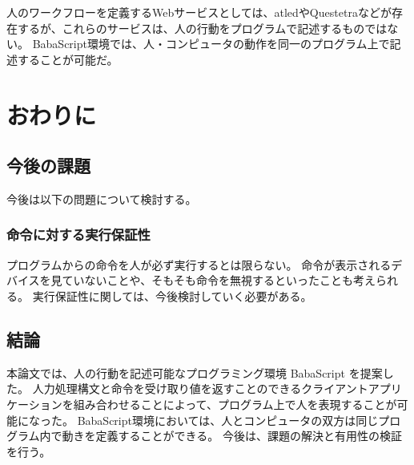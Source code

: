 \documentclass{deimj}
\begin{document}
人のワークフローを定義するWebサービスとしては、atled\cite{atled}やQuestetra\cite{questetra}などが存在するが、これらのサービスは、人の行動をプログラムで記述するものではない。
BabaScript環境では、人・コンピュータの動作を同一のプログラム上で記述することが可能だ。

\section{おわりに}
\subsection{今後の課題}
今後は以下の問題について検討する。
\subsubsection{命令に対する実行保証性}
プログラムからの命令を人が必ず実行するとは限らない。
命令が表示されるデバイスを見ていないことや、そもそも命令を無視するといったことも考えられる。
実行保証性に関しては、今後検討していく必要がある。

\subsection{結論}
本論文では、人の行動を記述可能なプログラミング環境 BabaScript を提案した。
人力処理構文と命令を受け取り値を返すことのできるクライアントアプリケーションを組み合わせることによって、プログラム上で人を表現することが可能になった。
BabaScript環境においては、人とコンピュータの双方は同じプログラム内で動きを定義することができる。
今後は、課題の解決と有用性の検証を行う。

\vspace{10mm}
\end{document}
